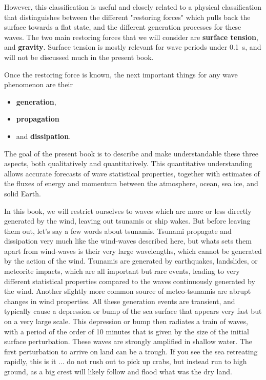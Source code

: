 However, this classification is useful and closely related to a physical classification that distinguishes 
between the different  "restoring forces" which pulls back the surface towards a flat state, and the different generation processes for these waves. 
The two main restoring forces that we will consider are  \textbf{surface tension}, and \textbf{gravity}. Surface tension is mostly relevant for wave periods under 0.1~s, and will not be discussed much in the present book.

Once the restoring force is known, the next important things for any wave phenomenon are their
\begin{itemize}
          \item \textbf{generation},
          \item \textbf{propagation} 
          \item and \textbf{dissipation}.
         \end{itemize}
The goal of the present book is to describe and make understandable these 
three aspects, both qualitatively and quantitatively. 
This quantitative understanding allows accurate forecasts of wave statistical properties, together with  estimates of the fluxes of energy and momentum between the atmosphere, ocean, sea ice, and solid Earth. 


In this book, we will restrict ourselves to waves which are more or less directly generated by the wind, leaving out 
tsunamis or ship wakes. But before leaving them out, let's say a few words about tsunamis. Tsunami propagate and dissipation very much like the wind-waves described here, but whats sets them apart from wind-waves is their very large wavelengths, 
which cannot be generated by the action of the wind. Tsunamis are generated by earthquakes, 
landslides, or meteorite 
impacts, which are all important but rare events, leading to very different statistical properties compared to the waves continuously 
generated by the wind. Another slightly more common source of meteo-tsunamis are abrupt changes in wind properties. 
All these generation events are transient, and typically cause a depression or bump of the sea surface that appears very fast but on a very 
large scale. This depression or bump then radiates a train of waves, with a period of the order of 10 minutes that is given by the size 
of the initial surface perturbation. These waves are strongly amplified in shallow water. The first perturbation to arrive on land can be a trough. 
If you see the sea retreating rapidly, this is it ... do not rush out to pick up crabs, but instead run to high ground, as a big crest will 
likely follow and flood what was the dry land. 


